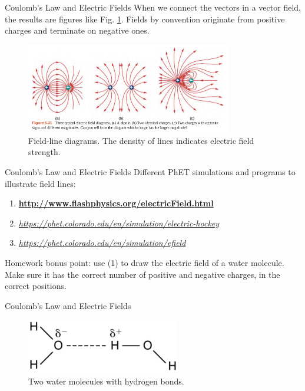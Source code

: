 \documentclass{beamer}
\begin{document}
\begin{frame}{Coulomb’s Law and Electric Fields}
When we connect the vectors in a vector field, the results are figures like Fig. \ref{fig:lines}.  Fields by convention originate from positive charges and terminate on negative ones.
\begin{figure}
\includegraphics[width=0.8\textwidth]{figures/lines.png}
\caption{\label{fig:lines} Field-line diagrams.  The density of lines indicates electric field strength.}
\end{figure}
\end{frame}

\begin{frame}{Coulomb’s Law and Electric Fields}
\small
Different PhET simulations and programs to illustrate field lines:
\begin{enumerate}
\item \textbf{\url{http://www.flashphysics.org/electricField.html}}
\item \textit{\url{https://phet.colorado.edu/en/simulation/electric-hockey}}
\item \textit{\url{https://phet.colorado.edu/en/simulation/efield}}
\end{enumerate}
Homework bonus point: use (1) to draw the electric field of a water molecule.  Make sure it has the correct number of positive and negative charges, in the correct positions.
\end{frame}

\begin{frame}{Coulomb’s Law and Electric Fields}
\begin{figure}
\centering
\includegraphics[width=0.6\textwidth]{figures/water.png}
\caption{\label{fig:water} Two water molecules with hydrogen bonds.}
\end{figure}
\end{frame}
\end{document}
